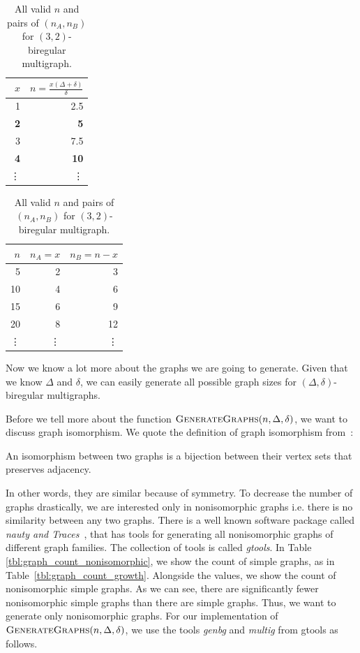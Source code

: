 \begin{table}[H]
  \parbox{.45\linewidth}{
  \centering
  \begin{tabular}{rr}
    \toprule
    $x$&$n=\frac{x(\Delta + \delta)}{\delta}$\\
    \midrule
    1 & 2.5 \\
    \textbf{2} & \textbf{5}   \\
    3 & 7.5 \\
    \textbf{4} & \textbf{10}  \\
    \vdots & \vdots \\
    \bottomrule
  \end{tabular}
  \caption{
    All values of $x$ and $n$ for $(3,2)$-biregular multigraph.
    All rows where $n$ is an integer, are bolded.
  }
  \label{tbl:values_of_x}
  }
  \hfill
  \parbox{.45\linewidth}{
  \centering
  \begin{tabular}{rrr}
    \toprule
    $n$&$n_A=x$&$n_B=n-x$\\
    \midrule
    5 & 2 & 3   \\
    10 & 4 & 6  \\
    15 & 6 & 9  \\
    20 & 8 & 12 \\
    \vdots & \vdots & \vdots\\
    \bottomrule
  \end{tabular}
  \caption{
    All valid $n$ and pairs of $(n_A, n_B)$ for $(3,2)$-biregular multigraph.
  }
  \label{tbl:valid_pairs}
  }
\end{table}

Now we know a lot more about the graphs we are going to generate.
Given that we know $\Delta$ and $\delta$, we can easily generate all possible graph sizes for $(\Delta, \delta)$-biregular multigraphs.

Before we tell more about the function $\textsc{GenerateGraphs}(n, \Delta, \delta)$, we want to discuss graph isomorphism.
We quote the definition of graph isomorphism from~\cite{DBLP:journals/jsc/McKayP14}:
\begin{displayquote}
An isomorphism between two graphs is a bijection between their vertex sets that preserves adjacency.
\end{displayquote}
In other words, they are similar because of symmetry.
To decrease the number of graphs drastically, we are interested only in nonisomorphic graphs i.e. there is no similarity between any two graphs.
There is a well known software package called \emph{nauty and Traces}~\cite{DBLP:journals/jsc/McKayP14}, that has tools for generating all nonisomorphic graphs of different graph families.
The collection of tools is called \emph{gtools}.
In Table \ref{tbl:graph_count_nonisomorphic}, we show the count of simple graphs, as in Table~\ref{tbl:graph_count_growth}.
Alongside the values, we show the count of nonisomorphic simple graphs.
As we can see, there are significantly fewer nonisomorphic simple graphs than there are simple graphs.
Thus, we want to generate only nonisomorphic graphs.
For our implementation of $\textsc{GenerateGraphs}(n, \Delta, \delta)$, we use the tools \emph{genbg} and \emph{multig} from gtools as follows.

